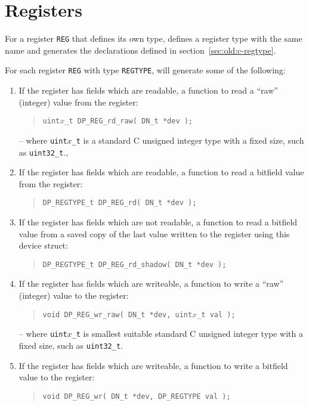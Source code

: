 \documentclass[a4paper,11pt,twoside]{report}
\begin{document}
\section{Registers}

For a register \texttt{REG} that defines its own type, \Mac defines
a register type with the same name and generates the declarations
defined in section~\ref{sec:old:c-regtype}. 

For each register \texttt{REG} with type \texttt{REGTYPE}, \Mac will
generate some of the following:

\begin{enumerate}

\item If the register has fields which are readable, a function to
  read a ``raw'' (integer) value from the register:
  \begin{quote}
    \texttt{uint$x$\_t DP\_REG\_rd\_raw( DN\_t *dev );}
  \end{quote}
  -- where \texttt{uint$x$\_t} is a standard C unsigned integer type
  with a fixed size, such as \texttt{uint32\_t}., 

\item If the register has fields which are readable, a function to
  read a bitfield value from the register:
  \begin{quote}
    \texttt{DP\_REGTYPE\_t  DP\_REG\_rd( DN\_t *dev );}
  \end{quote}

\item If the register has fields which are not readable, a function to
  read a bitfield value from a saved copy of the last value written to
  the register using this device struct:
  \begin{quote}
    \texttt{DP\_REGTYPE\_t  DP\_REG\_rd\_shadow( DN\_t *dev );}
  \end{quote}

\item If the register has fields which are writeable, a function to
  write a ``raw'' (integer) value to the register:
  \begin{quote}
    \texttt{void DP\_REG\_wr\_raw( DN\_t *dev, uint$x$\_t val );}
  \end{quote}
  -- where \texttt{uint$x$\_t} is smallest suitable standard C
  unsigned integer type with a fixed size, such as
  \texttt{uint32\_t}.

\item If the register has fields which are writeable, a function to
  write a bitfield value to the register:
  \begin{quote}
    \texttt{void DP\_REG\_wr( DN\_t *dev, DP\_REGTYPE val );}
  \end{quote}
  

\end{enumerate}
\end{document}

